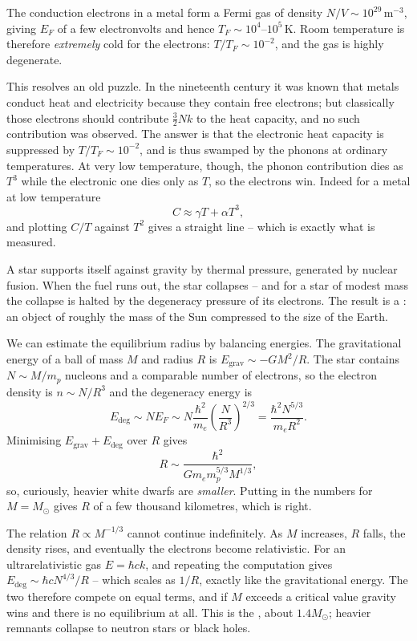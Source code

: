 \documentclass[a4paper]{scrartcl}
\begin{document}
\begin{example}
	The conduction electrons in a metal form a Fermi gas of density $N/V \sim 10^{29}\,\mathrm{m}^{-3}$, giving $E_F$ of a few electronvolts and hence $T_F \sim 10^4$--$10^5\,\mathrm{K}$. Room temperature is therefore \emph{extremely} cold for the electrons: $T/T_F \sim 10^{-2}$, and the gas is highly degenerate.

	This resolves an old puzzle. In the nineteenth century it was known that metals conduct heat and electricity because they contain free electrons; but classically those electrons should contribute $\tfrac 32 Nk$ to the heat capacity, and no such contribution was observed. The answer is that the electronic heat capacity is suppressed by $T/T_F \sim 10^{-2}$, and is thus swamped by the phonons at ordinary temperatures. At very low temperature, though, the phonon contribution dies as $T^3$ while the electronic one dies only as $T$, so the electrons win. Indeed for a metal at low temperature
	$$
	C \approx \gamma T + \alpha T^3,
	$$
	and plotting $C/T$ against $T^2$ gives a straight line -- which is exactly what is measured.
\end{example}

\begin{example}
	A star supports itself against gravity by thermal pressure, generated by nuclear fusion. When the fuel runs out, the star collapses -- and for a star of modest mass the collapse is halted by the degeneracy pressure of its electrons. The result is a : an object of roughly the mass of the Sun compressed to the size of the Earth.

	We can estimate the equilibrium radius by balancing energies. The gravitational energy of a ball of mass $M$ and radius $R$ is $E_{\mathrm{grav}} \sim -GM^2/R$. The star contains $N \sim M/m_p$ nucleons and a comparable number of electrons, so the electron density is $n \sim N/R^3$ and the degeneracy energy is
	$$
	E_{\mathrm{deg}} \sim N E_F \sim N \frac{\hbar^2}{m_e}\left(\frac{N}{R^3}\right)^{2/3} = \frac{\hbar^2 N^{5/3}}{m_e R^2}.
	$$
	Minimising $E_{\mathrm{grav}} + E_{\mathrm{deg}}$ over $R$ gives
	$$
	R \sim \frac{\hbar^2}{G m_e m_p^{5/3} M^{1/3}},
	$$
	so, curiously, heavier white dwarfs are \emph{smaller}. Putting in the numbers for $M = M_\odot$ gives $R$ of a few thousand kilometres, which is right.

	The relation $R \propto M^{-1/3}$ cannot continue indefinitely. As $M$ increases, $R$ falls, the density rises, and eventually the electrons become relativistic. For an ultrarelativistic gas $E = \hbar c k$, and repeating the computation gives $E_{\mathrm{deg}} \sim \hbar c N^{4/3}/R$ -- which scales as $1/R$, exactly like the gravitational energy. The two therefore compete on equal terms, and if $M$ exceeds a critical value gravity wins and there is no equilibrium at all. This is the , about $1.4 M_\odot$; heavier remnants collapse to neutron stars or black holes.
\end{example}
\end{document}
